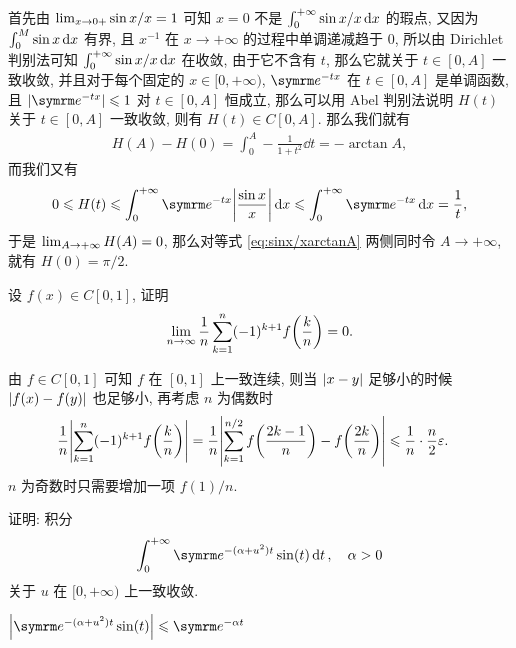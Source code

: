 \begin{exercise}[series=exer]
\begin{answer}
      首先由 $ \lim_{x \to 0+}\sin x/x = 1 $ 可知 $ x = 0 $ 不是 $ \int_{0}^{+\infty}\sin x/x \dx* $ 的瑕点, 又因为 $ \int_{0}^{M}\sin x\dx* $ 有界, 且 $ x^{-1} $ 在 $ x \to +\infty $ 的过程中单调递减趋于 $ 0 $, 所以由 Dirichlet 判别法可知 $ \int_{0}^{+\infty} \sin x/x \dx* $ 在收敛, 由于它不含有 $ t $, 那么它就关于 $ t\in [0, A] $ 一致收敛, 并且对于每个固定的 $ x \in [0, +\infty) $, $ \me^{-tx} $ 在 $ t\in[0, A] $ 是单调函数, 且 $ \abs{\me^{-tx}} \le 1 $ 对 $ t \in [0, A] $ 恒成立, 那么可以用 Abel 判别法说明 $ H(t) $ 关于 $ t \in [0, A] $ 一致收敛, 则有 $ H(t) \in C[0, A] $. 那么我们就有
      \begin{align}\label{eq:sinx/xarctanA}
          H(A) - H(0) = \int_{0}^{A} -\frac{1}{1 + t^{2}} \dd{t} = -\arctan A,
      \end{align}
      而我们又有
      \begin{align*}
          0 \le H(t) \le \int_{0}^{+\infty} \me^{-tx}\abs{\frac{\sin x}{x}} \dx* \le \int_{0}^{+\infty} \me^{-tx} \dx* = \frac{1}{t},
      \end{align*}
      于是 $ \lim_{A \to +\infty} H(A) = 0 $, 那么对等式 \eqref{eq:sinx/xarctanA} 两侧同时令 $ A \to +\infty $, 就有 $ H(0) = \pi/2 $.
  \end{answer}
  \item 设 $ f(x) \in C[0, 1] $, 证明
  \begin{align*}
      \lim_{n \to \infty} \frac{1}{n} \sum_{k=1}^{n} (-1)^{k+1} f\qty(\frac{k}{n}) = 0.
  \end{align*}
  \begin{hint}
      由 $ f \in C[0, 1] $ 可知 $ f $ 在 $ [0, 1] $ 上一致连续, 则当 $ \abs{x - y} $ 足够小的时候 $ \abs{f(x) - f(y)} $ 也足够小, 再考虑 $ n $ 为偶数时
      \begin{align*}
          \frac{1}{n} \abs{\sum_{k=1}^{n} (-1)^{k+1} f\qty(\frac{k}{n})} & = \frac{1}{n}\abs{\sum_{k = 1}^{n/2}f\qty(\frac{2k-1}{n}) - f\qty(\frac{2k}{n})} \leqslant \frac{1}{n}\cdot\frac{n}{2}\varepsilon.
      \end{align*}
      $ n $ 为奇数时只需要增加一项 $ f(1)/n $.
  \end{hint}
  \item 证明: 积分
  \begin{align*}
      \int_{0}^{+\infty} \me^{-(\alpha + u^{2})t} \sin(t) \dd{t},\quad \alpha > 0
  \end{align*}
  关于 $ u $ 在 $ [0, +\infty) $ 上一致收敛.
  \begin{hint}
      $ \abs{\me^{-(\alpha + u^{2})t} \sin(t)} \le \me^{-\alpha t} $
  \end{hint}

\end{exercise}
